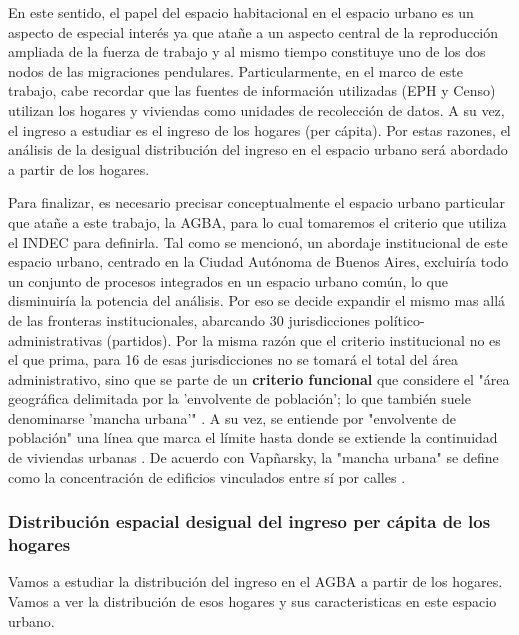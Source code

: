 En este sentido, el papel del espacio habitacional en el espacio urbano es un aspecto de especial interés ya que atañe a un aspecto central de la reproducción ampliada de la fuerza de trabajo y al mismo tiempo constituye uno de los dos nodos de las migraciones pendulares. Particularmente, en el marco de este trabajo, cabe recordar que las fuentes de información utilizadas (EPH y Censo) utilizan los hogares y viviendas como unidades de recolección de datos. A su vez, el ingreso a estudiar es el ingreso de los hogares (per cápita). Por estas razones, el análisis de la desigual distribución del ingreso en el espacio urbano será abordado a partir de los hogares.  

Para finalizar, es necesario precisar conceptualmente el espacio urbano particular que atañe a este trabajo, la AGBA, para lo cual tomaremos el criterio que utiliza el INDEC para definirla. Tal como se mencionó, un abordaje institucional de este espacio urbano, centrado en la Ciudad Autónoma de Buenos Aires, excluiría todo un conjunto de procesos integrados en un espacio urbano común, lo que disminuiría la potencia del análisis. Por eso se decide expandir el mismo mas allá de las fronteras institucionales, abarcando 30 jurisdicciones político-administrativas (partidos). Por la misma razón que el criterio institucional no es el que prima, para 16 de esas jurisdicciones no se tomará el total del área administrativo, sino que se parte de un \textbf{criterio funcional} que considere el "área geográfica delimitada por la 'envolvente de población'; lo que también suele denominarse 'mancha urbana'" \cite{indec2003e}. A su vez, se entiende por "envolvente de población" una línea que marca el límite hasta donde se extiende la continuidad de viviendas urbanas \cite{indec2003e}. De acuerdo con Vapñarsky, la "mancha urbana" se define como la concentración de edificios vinculados entre sí por calles \cite{vapniarsky1995,vapniarsky1998}.
 
 


\subsubsection{Distribución espacial desigual del ingreso per cápita de los hogares}





Vamos a estudiar la distribución del ingreso en el AGBA a partir de los hogares. Vamos a ver la distribución de esos hogares y sus caracteristicas en este espacio urbano. 

